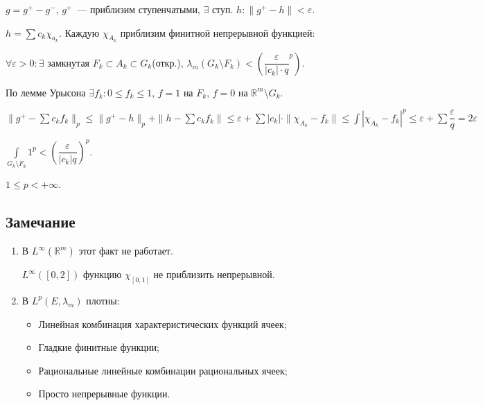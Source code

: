 \documentclass{article}
\begin{document}
            $g = g^+ - g^-$, $g^+$~--- приблизим ступенчатыми, $\exists$ ступ. $h : \| g^+ - h \| < \varepsilon$.
            
            $h = \sum c_k \chi_{a_k}$. Каждую $\chi_{A_k}$ приблизим финитной непрерывной функцией:
            
            $\forall \varepsilon > 0 : \exists$ замкнутая $F_k \subset A_k \subset G_k$(откр.), $\lambda_m \left( G_k \setminus F_k \right) < \left(\dfrac{\varepsilon}{|c_k|\cdot q}^p \right)$.
            
            По лемме Урысона $\exists f_k : 0 \leqslant f_k \leqslant 1$, $f = 1$ на $F_k$, $f = 0$ на $\mathbb{R}^m \setminus G_k$.
            
            $\| g^+ - \sum c_k f_k \|_p \leqslant \| g^+ - h \|_p + \| h - \sum c_k f_k \| \leqslant \varepsilon + \sum |c_k| \cdot \| \chi_{A_k} - f_k \| \leqslant \int \left| \chi_{A_k} - f_k \right|^p \leqslant \varepsilon + \sum \dfrac{\varepsilon}{q} = 2 \varepsilon$
            
            $\int\limits_{G_k \setminus F_k} 1^p < \left( \dfrac{\varepsilon}{|c_k|q} \right)^p$.
            
            $1 \leqslant p < +\infty$.
            
        \subsection{Замечание}
        
            \begin{enumerate}
            
                \item В $L^{\infty} \left( \mathbb{R}^m \right)$ этот факт не работает.
                
                    $L^{\infty} \left( [0, 2] \right)$ функцию $\chi_{[0, 1]}$ не приблизить непрерывной.
                    
                \item В $L^p \left( E, \lambda_m \right)$ плотны:
                
                    \begin{itemize}
                    
                        \item Линейная комбинация характеристических функций ячеек;
                
                        \item Гладкие финитные функции;
                        
                        \item Рациональные линейные комбинации рациональных ячеек;
                        
                        \item Просто непрерывные функции.
                        
                    \end{itemize}
                    
            \end{enumerate}
    
\end{document}
